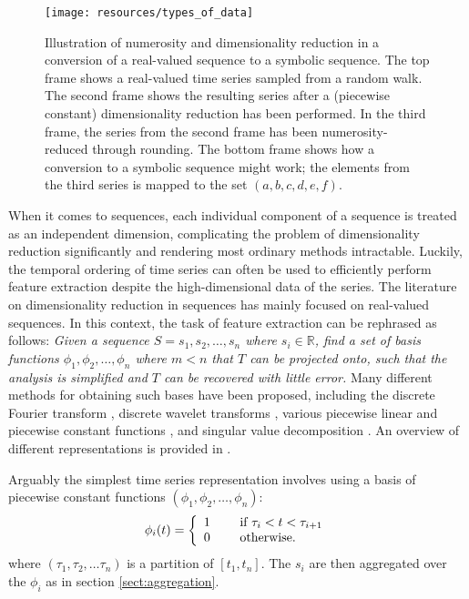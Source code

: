 \begin{figure}[htb]
  \begin{center}
    \leavevmode
    \texttt{[image: resources/types\_of\_data]}
  \end{center}
  \caption{\small{Illustration of numerosity and dimensionality reduction in a conversion of a real-valued sequence to a symbolic sequence. The top frame shows a real-valued time series sampled from a random walk. The second frame shows the resulting series after a (piecewise constant) dimensionality reduction has been performed. In the third frame, the series from the second frame has been numerosity-reduced through rounding. The bottom frame shows how a conversion to a symbolic sequence might work; the elements from the third series is mapped to the set $(a,b,c,d,e,f)$.}}
  \label{fig:types_of_data}
\end{figure}

When it comes to sequences, each individual component of a sequence is treated as an independent dimension, complicating the problem of dimensionality reduction significantly and rendering most ordinary methods intractable. Luckily, the temporal ordering of time series can often be used to efficiently perform feature extraction despite the high-dimensional data of the series. The literature on dimensionality reduction in sequences has mainly focused on real-valued sequences. In this context, the task of feature extraction can be rephrased as follows: \emph{Given a sequence $S = s_1, s_2, \dots, s_n$ where $s_i \in \mathbb{R}$, find a set of basis functions $\phi_1, \phi_2, \dots, \phi_n$ where $m < n$ that $T$ can be projected onto, such that the analysis is simplified and $T$ can be recovered with little error.} Many different methods for obtaining such bases have been proposed, including the discrete Fourier transform \cite{faloutsos1}, discrete wavelet transforms \cite{pong}, various piecewise linear and piecewise constant functions \cite{keogh3} \cite{geurts}, and singular value decomposition \cite{keogh3}. An overview of different representations is provided in \cite{fabian}.

Arguably the simplest time series representation involves using a basis of piecewise constant functions $(\phi_1, \phi_2, \dots, \phi_n)$:
\[
  \phi_i(t) = \left\{
    \begin{array}{l l}
      1 & \quad \text{ if } \tau_i < t < \tau_{i+1} \\
      0 & \quad \text{ otherwise.} \\
    \end{array} \right.
\]
where $(\tau_1, \tau_2, \dots \tau_n)$ is a partition of $[t_1, t_n]$. The $s_i$ are then aggregated over the $\phi_i$ as in section \ref{sect:aggregation}. 

